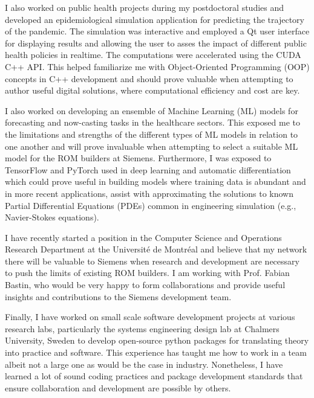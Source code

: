 \documentclass[12pt]{article} %
\begin{document}
\medskip %

I also worked on public health projects during my postdoctoral studies and developed an epidemiological simulation application for predicting the trajectory of the pandemic. The simulation was interactive and employed a Qt user interface for displaying results and allowing the user to asses the impact of different public health policies in realtime. The computations were accelerated using the CUDA C++ API. This helped familiarize me with Object-Oriented Programming (OOP) concepts in C++ development and should prove valuable when attempting to author useful digital solutions, where computational efficiency and cost are key.

\medskip %

I also worked on developing an ensemble of Machine Learning (ML) models for forecasting and now-casting tasks in the healthcare sectors. This exposed me to the limitations and strengths of the different types of ML models in relation to one another and will prove invaluable when attempting to select a suitable ML model for the ROM builders at Siemens. Furthermore, I was exposed to TensorFlow and PyTorch used in deep learning and automatic differentiation which could prove useful in building models where training data is abundant and in more recent applications, assist with approximating the solutions to known Partial Differential Equations (PDEs) common in engineering simulation (e.g., Navier-Stokes equations).

\medskip %

I have recently started a position in the Computer Science and Operations Research Department at the Universit\'{e} de Montr\'{e}al and believe that my network there will be valuable to Siemens when research and development are necessary to push the limits of existing ROM builders. I am working with Prof. Fabian Bastin, who would be very happy to form collaborations and provide useful insights and contributions to the Siemens development team.

\medskip %

Finally, I have worked on small scale software development projects at various research labs, particularly the systems engineering design lab at Chalmers University, Sweden to develop open-source python packages for translating theory into practice and software. This experience has taught me how to work in a team albeit not a large one as would be the case in industry. Nonetheless, I have learned a lot of sound coding practices and package development standards that ensure collaboration and development are possible by others.
\end{document}
